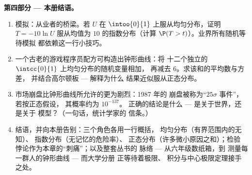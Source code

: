 \begin{problem}
\medskip
\noindent\textbf{第四部分 --- 本册结语。}
\begin{enumerate}[resume]
  \item 模拟：从业者的桥梁。若 $U$ 在
        $\intoo{0}{1}$ 上服从均匀分布，证明
        $T = -10\ln U$ 服从均值为 $10$ 的指数分布（计算
        $\P(T > t)$）。业界所有随机等待模拟
        都依赖这一行小技巧。
  \item 一个古老的游戏程序员配方可构造出钟形曲线：将
        十二个独立的 $\intcc{0}{1}$ 上均匀分布的随机变量相加，
        再减去 $6$。求该和的平均数与方差，
        并结合高尔顿板 --- 解释为什么
        结果近似服从正态分布。
  \item 市场崩盘比钟形曲线所允许的更为剧烈：1987 年的
        崩盘被称为“$25\sigma$ 事件”，若按正态假设，
        其概率约为 $10^{-137}$。
        正确的结论是什么 --- 是关于世界，还是关于
        模型？（一句话，统计学家的
        信条。）
  \item 结语，并向本册告别：三个角色各用一行概括，
        均匀分布（有界范围内的无知）、
        指数分布（无记忆的危险率）、
        正态分布（许多微小原因之和）；检验
        悖论作为本章的“刺痛”；以及整套丛书的
        脉络 --- 从六年级数纸箱，到
        测量每一群人的钟形曲线 --- 而大学分册
        正等待着极限、
        积分与中心极限定理接手之处。
\end{enumerate}
\end{problem}
